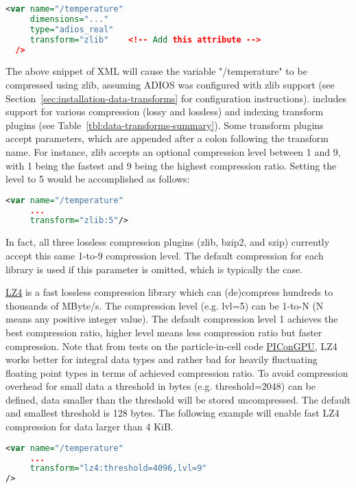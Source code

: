 \begin{lstlisting}[language=XML]
<var name="/temperature"
     dimensions="..."
     type="adios_real"
     transform="zlib"    <!-- Add this attribute -->
  />
\end{lstlisting}

The above snippet of XML will cause the variable "/temperature" to be compressed using zlib, assuming ADIOS was configured with zlib support
(see Section~\ref{sec:installation-data-transforms} for configuration instructions). \adiosversion includes support for 
various compression (lossy and lossless) and indexing transform plugins (see Table~\ref{tbl:data-transforms-summary}).
Some transform plugins accept parameters, which are appended after a colon following the transform name.
For instance, zlib accepts an optional compression level between 1 and 9, with 1 being the fastest and
9 being the highest compression ratio. Setting the level to 5 would be accomplished as follows:

\begin{lstlisting}[language=XML]
<var name="/temperature"
     ...
     transform="zlib:5"/>
\end{lstlisting}

In fact, all three lossless compression plugins (zlib, bzip2, and szip) currently accept this same
1-to-9 compression level. The default compression for each library is used if this parameter is
omitted, which is typically the case.


\href{https://github.com/lz4/lz4}{LZ4} is a fast lossless compression library which can (de)compress hundreds to thousands of MByte/s.
The compression level (e.g. lvl=5) can be 1-to-N (N means any positive integer value). 
The default compression level 1 achieves the best compression ratio, higher level means less compression ratio but faster compression.
Note that from tests on the particle-in-cell code \href{http://picongpu.hzdr.de}{PIConGPU}, LZ4 works better for integral data types and rather bad for heavily fluctuating floating point types in terms of achieved compression ratio.
To avoid compression overhead for small data a threshold in bytes (e.g. threshold=2048) can be defined, data smaller than the threshold will be stored uncompressed.
The default and smallest threshold is 128 bytes.
The following example will enable fast LZ4 compression for data larger than 4 KiB.

\begin{lstlisting}[language=XML]
<var name="/temperature"
     ...
     transform="lz4:threshold=4096,lvl=9"
/>
\end{lstlisting}


